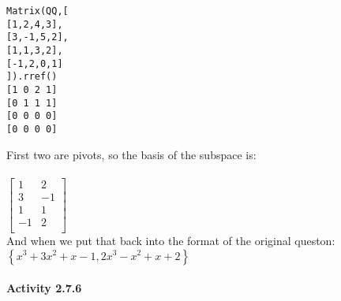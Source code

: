 \documentclass{article}
\begin{document}
{\begin{verbatim}
Matrix(QQ,[
[1,2,4,3],
[3,-1,5,2],
[1,1,3,2],
[-1,2,0,1]
]).rref()
[1 0 2 1]
[0 1 1 1]
[0 0 0 0]
[0 0 0 0]
\end{verbatim}
First two are pivots, so the basis of the subspace is:\\
\\
$\left[\begin{matrix}
1 & 2  \\
3 & -1  \\
1 & 1  \\
-1 & 2  \\
\end{matrix}\right]$\\
And when we put that back into the format of the original queston:\\
$\left\{x^{3} + 3x^{2} + x - 1, 2x^{3} - x^{2} + x + 2\right\}$\\
\\
\newpage
\noindent \textbf{Activity 2.7.6}

}
\end{document}
